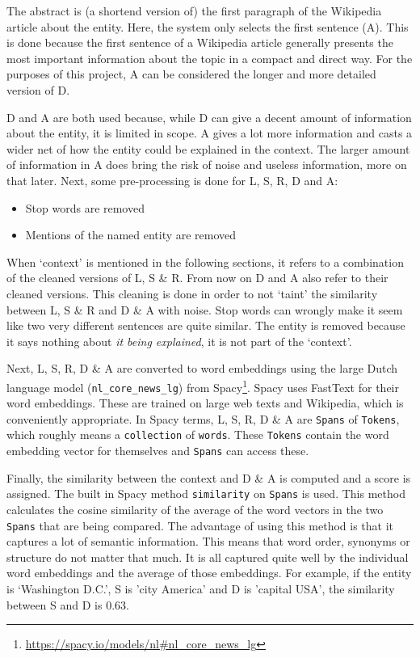 \documentclass[
10pt, %
a4paper, %
oneside, %
headinclude,footinclude, %
] {book}%
\begin{document}
The abstract is (a shortend version of) the first paragraph of the Wikipedia article about the entity.
Here, the system only selects the first sentence (A).
This is done because the first sentence of a Wikipedia article generally presents the most important information about the topic in a compact and direct way.
For the purposes of this project, A can be considered the longer and more detailed version of D.

D and A are both used because, while D can give a decent amount of information about the entity, it is limited in scope.
A gives a lot more information and casts a wider net of how the entity could be explained in the context.
The larger amount of information in A does bring the risk of noise and useless information, more on that later.
Next, some pre-processing is done for L, S, R, D and A:

\begin{itemize}
  \item Stop words are removed
  \item Mentions of the named entity are removed
\end{itemize}

When `context' is mentioned in the following sections, it refers to a combination of the cleaned versions of L, S \& R.
From now on D and A also refer to their cleaned versions.
This cleaning is done in order to not `taint' the similarity between L, S \& R and D \& A with noise.
Stop words can wrongly make it seem like two very different sentences are quite similar.
The entity is removed because it says nothing about \textit{it being explained}, it is not part of the `context'.

Next, L, S, R, D \& A are converted to word embeddings using the large Dutch language model (\verb+nl_core_news_lg+) from Spacy\footnote{\url{https://spacy.io/models/nl\#nl_core_news_lg}}.
Spacy uses FastText \citep{bojanowski2016} for their word embeddings.
These are trained on large web texts and Wikipedia, which is conveniently appropriate.
In Spacy terms, L, S, R, D \& A are \verb+Spans+ of \verb+Tokens+, which roughly means a \verb+collection+ of \verb+words+.
These \verb+Tokens+ contain the word embedding vector for themselves and \verb+Spans+ can access these.

Finally, the similarity between the context and D \& A is computed and a score is assigned.
The built in Spacy method \verb+similarity+ on \verb+Spans+ is used.
This method calculates the cosine similarity of the average of the word vectors in the two \verb+Spans+ that are being compared.
The advantage of using this method is that it captures a lot of semantic information.
This means that word order, synonyms or structure do not matter that much.
It is all captured quite well by the individual word embeddings and the average of those embeddings.
For example, if the entity is `Washington D.C.', S is 'city America' and D is 'capital USA', the similarity between S and D is 0.63.
\end{document}
